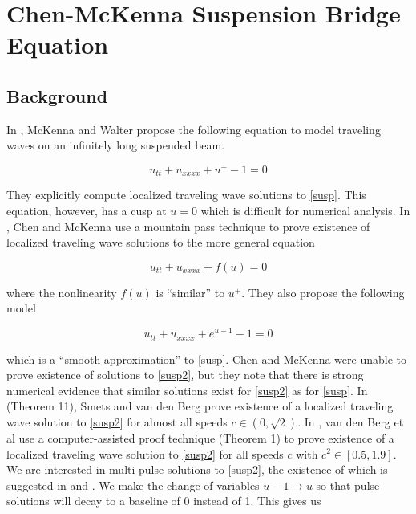 \documentclass[12pt]{article}
\begin{document}
\section{Chen-McKenna Suspension Bridge Equation}

\subsection{Background}

In \cite{McKenna1990}, McKenna and Walter propose the following equation to model traveling waves on an infinitely long suspended beam.

\begin{equation}\label{susp}
u_{tt} + u_{xxxx} + u^+ - 1 = 0
\end{equation}

They explicitly compute localized traveling wave solutions to \eqref{susp}. This equation, however, has a cusp at $u = 0$ which is difficult for numerical analysis. In \cite{Chen1997}, Chen and McKenna use a mountain pass technique to prove existence of localized traveling wave solutions to the more general equation

\begin{equation}\label{suspgen}
u_{tt} + u_{xxxx} + f(u) = 0
\end{equation}

where the nonlinearity $f(u)$ is ``similar'' to $u^+$. They also propose the following model

\begin{equation}\label{susp2}
u_{tt} + u_{xxxx} + e^{u - 1} - 1 = 0
\end{equation}

which is a ``smooth approximation'' to \eqref{susp}. Chen and McKenna were unable to prove existence of solutions to \eqref{susp2}, but they note that there is strong numerical evidence that similar solutions exist for \eqref{susp2} as for \eqref{susp}. In \cite{Smets2002} (Theorem 11), Smets and van den Berg prove existence of a localized traveling wave solution to \eqref{susp2} for almost all speeds $c \in (0, \sqrt{2})$. In \cite{Berg2018}, van den Berg et al use a computer-assisted proof technique (Theorem 1) to prove existence of a localized traveling wave solution to \eqref{susp2} for all speeds $c$ with $c^2 \in [0.5, 1.9]$.\\

We are interested in multi-pulse solutions to \eqref{susp2}, the existence of which is suggested in \cite{Chen1997} and \cite{Sandstede1997}. We make the change of variables $u - 1 \mapsto u$ so that pulse solutions will decay to a baseline of 0 instead of 1. This gives us
\end{document}

